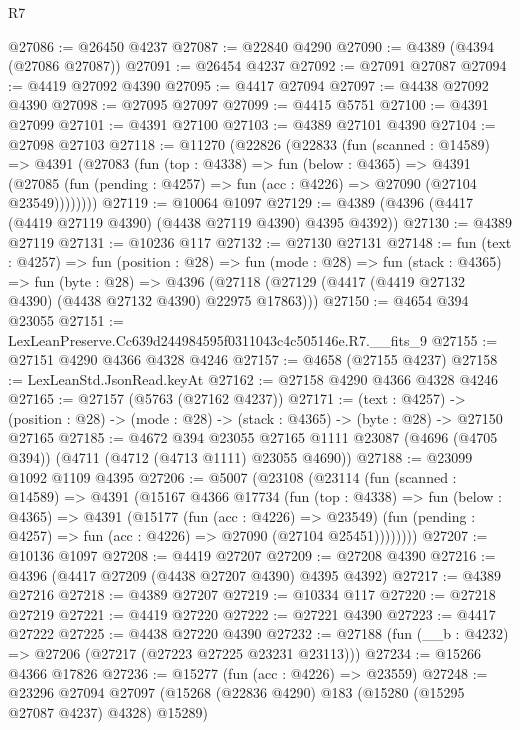 \begin{lexlean}{R7}
\begin{coremodule}
@27086 := @26450 @4237
@27087 := @22840 @4290
@27090 := @4389 (@4394 (@27086 @27087))
@27091 := @26454 @4237
@27092 := @27091 @27087
@27094 := @4419 @27092 @4390
@27095 := @4417 @27094
@27097 := @4438 @27092 @4390
@27098 := @27095 @27097
@27099 := @4415 @5751
@27100 := @4391 @27099
@27101 := @4391 @27100
@27103 := @4389 @27101 @4390
@27104 := @27098 @27103
@27118 := @11270
    (@22826
      (@22833
        (fun (scanned : @14589) =>
        @4391
          (@27083
            (fun (top : @4338) =>
            fun (below : @4365) =>
            @4391
              (@27085 (fun (pending : @4257) => fun (acc : @4226) => @27090 (@27104 @23549))))))))
@27119 := @10064 @1097
@27129 := @4389 (@4396 (@4417 (@4419 @27119 @4390) (@4438 @27119 @4390) @4395 @4392))
@27130 := @4389 @27119
@27131 := @10236 @117
@27132 := @27130 @27131
@27148 := fun (text : @4257) =>
  fun (position : @28) =>
  fun (mode : @28) =>
  fun (stack : @4365) =>
  fun (byte : @28) =>
  @4396 (@27118 (@27129 (@4417 (@4419 @27132 @4390) (@4438 @27132 @4390) @22975 @17863)))
@27150 := @4654 @394 @23055
@27151 := LexLeanPreserve.Cc639d244984595f0311043c4c505146e.R7.__fits_9
@27155 := @27151 @4290 @4366 @4328 @4246
@27157 := @4658 (@27155 @4237)
@27158 := LexLeanStd.JsonRead.keyAt
@27162 := @27158 @4290 @4366 @4328 @4246
@27165 := @27157 (@5763 (@27162 @4237))
@27171 := (text : @4257) ->
  (position : @28) -> (mode : @28) -> (stack : @4365) -> (byte : @28) -> @27150 @27165
@27185 := @4672
    @394
    @23055
    @27165
    @1111
    @23087
    (@4696 (@4705 @394))
    (@4711 (@4712 (@4713 @1111) @23055 @4690))
@27188 := @23099 @1092 @1109 @4395
@27206 := @5007
    (@23108
      (@23114
        (fun (scanned : @14589) =>
        @4391
          (@15167
            @4366
            @17734
            (fun (top : @4338) =>
            fun (below : @4365) =>
            @4391
              (@15177
                (fun (acc : @4226) => @23549)
                (fun (pending : @4257) => fun (acc : @4226) => @27090 (@27104 @25451))))))))
@27207 := @10136 @1097
@27208 := @4419 @27207
@27209 := @27208 @4390
@27216 := @4396 (@4417 @27209 (@4438 @27207 @4390) @4395 @4392)
@27217 := @4389 @27216
@27218 := @4389 @27207
@27219 := @10334 @117
@27220 := @27218 @27219
@27221 := @4419 @27220
@27222 := @27221 @4390
@27223 := @4417 @27222
@27225 := @4438 @27220 @4390
@27232 := @27188 (fun (__b : @4232) => @27206 (@27217 (@27223 @27225 @23231 @23113)))
@27234 := @15266 @4366 @17826
@27236 := @15277 (fun (acc : @4226) => @23559)
@27248 := @23296
    @27094
    @27097
    (@15268 (@22836 @4290) @183 (@15280 (@15295 @27087 @4237) @4328) @15289)

\end{coremodule}
\end{lexlean}
